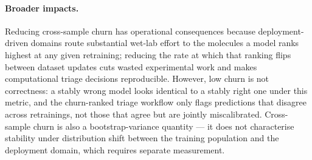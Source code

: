 \paragraph{Broader impacts.}
Reducing cross-sample churn has operational consequences because
deployment-driven domains route substantial wet-lab effort to the
molecules a model ranks highest at any given retraining; reducing
the rate at which that ranking flips between dataset updates cuts
wasted experimental work and makes computational triage decisions
reproducible.  However, low churn is not correctness: a stably wrong
model looks identical to a stably right
one under this metric, and the churn-ranked triage workflow only
flags predictions that disagree across retrainings, not those that
agree but are jointly miscalibrated.  Cross-sample churn is also a
bootstrap-variance quantity --- it does not characterise stability
under distribution shift between the training population and the
deployment domain, which requires separate measurement.

